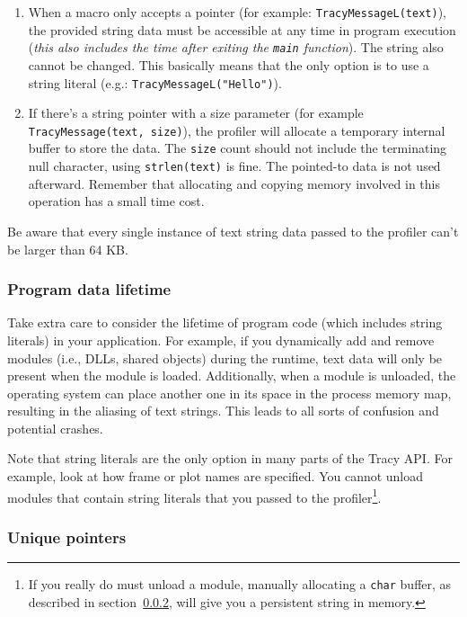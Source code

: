 \documentclass[hidelinks,titlepage,a4paper,twoside]{article}
\begin{document}
\begin{enumerate}
\item When a macro only accepts a pointer (for example: \texttt{TracyMessageL(text)}), the provided string data must be accessible at any time in program execution (\emph{this also includes the time after exiting the \texttt{main} function}). The string also cannot be changed. This basically means that the only option is to use a string literal (e.g.: \texttt{TracyMessageL("Hello")}).

\item If there's a string pointer with a size parameter (for example \texttt{TracyMessage(text, size)}), the profiler will allocate a temporary internal buffer to store the data. The \texttt{size} count should not include the terminating null character, using \texttt{strlen(text)} is fine. The pointed-to data is not used afterward. Remember that allocating and copying memory involved in this operation has a small time cost.
\end{enumerate}

Be aware that every single instance of text string data passed to the profiler can't be larger than 64 KB.

\subsubsection{Program data lifetime}
\label{datalifetime}

Take extra care to consider the lifetime of program code (which includes string literals) in your application. For example, if you dynamically add and remove modules (i.e., DLLs, shared objects) during the runtime, text data will only be present when the module is loaded. Additionally, when a module is unloaded, the operating system can place another one in its space in the process memory map, resulting in the aliasing of text strings. This leads to all sorts of confusion and potential crashes.

Note that string literals are the only option in many parts of the Tracy API. For example, look at how frame or plot names are specified. You cannot unload modules that contain string literals that you passed to the profiler\footnote{If you really do must unload a module, manually allocating a \texttt{char} buffer, as described in section~\ref{uniquepointers}, will give you a persistent string in memory.}.

\subsubsection{Unique pointers}
\label{uniquepointers}
\end{document}
